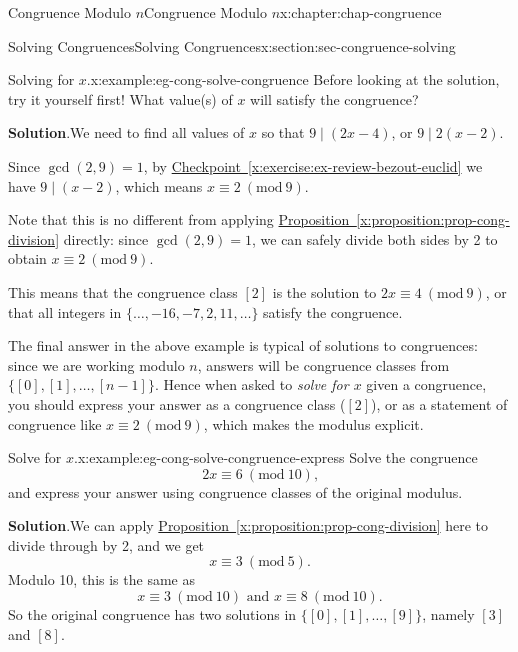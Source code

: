 \documentclass[oneside,10pt,]{book}
\newcommand{\blocktitlefont}{\relax}
\newcommand{\xreffont}{\relax}
\numberwithin{equation}{section}
\newcommand{\Mod}[1]{\ \left(\mathrm{mod}\ #1\right)}
\begin{document}
\begin{chapterptx}{Congruence Modulo \(n\)}{}{Congruence Modulo \(n\)}{}{}{x:chapter:chap-congruence}
\begin{sectionptx}{Solving Congruences}{}{Solving Congruences}{}{}{x:section:sec-congruence-solving}
\begin{example}{Solving for \(x\).}{x:example:eg-cong-solve-congruence}
Before looking at the solution, try it yourself first! What value(s) of \(x\) will satisfy the congruence?%
\par\smallskip%
\noindent\textbf{\blocktitlefont Solution}.\hypertarget{g:solution:id468645}{}\quad{}We need to find all values of \(x\) so that \(9 \mid (2x - 4)\), or \(9 \mid 2(x-2)\).%
\par
Since \(\gcd(2,9) = 1\), by \hyperref[x:exercise:ex-review-bezout-euclid]{Checkpoint~{\xreffont\ref{x:exercise:ex-review-bezout-euclid}}} we have \(9 \mid (x-2)\), which means \(x \equiv 2 \Mod{9}\).%
\par
Note that this is no different from applying \hyperref[x:proposition:prop-cong-division]{Proposition~{\xreffont\ref{x:proposition:prop-cong-division}}} directly: since \(\gcd(2,9) = 1\), we can safely divide both sides by 2 to obtain \(x \equiv 2 \Mod{9}\).%
\par
This means that the congruence class \([2]\) is the solution to \(2x \equiv 4 \Mod{9}\), or that all integers in \(\{\ldots,-16,-7,2,11,\ldots\}\) satisfy the congruence.%
\end{example}
The final answer in the above example is typical of solutions to congruences: since we are working modulo \(n\), answers will be congruence classes from \(\{[0],[1],\ldots,[n-1]\}\). Hence when asked to \emph{solve for \(x\)} given a congruence, you should express your answer as a congruence class (\([2]\)), or as a statement of congruence like \(x \equiv 2 \Mod{9}\), which makes the modulus explicit.%
\begin{example}{Solve for \(x\).}{x:example:eg-cong-solve-congruence-express}%
Solve the congruence%
\begin{equation*}
2x \equiv 6 \Mod{10}\text{,}
\end{equation*}
and express your answer using congruence classes of the original modulus.%
\par\smallskip%
\noindent\textbf{\blocktitlefont Solution}.\hypertarget{g:solution:id469026}{}\quad{}We can apply \hyperref[x:proposition:prop-cong-division]{Proposition~{\xreffont\ref{x:proposition:prop-cong-division}}} here to divide through by 2, and we get%
\begin{equation*}
x \equiv 3 \Mod{5}\text{.}
\end{equation*}
Modulo 10, this is the same as%
\begin{equation*}
x \equiv 3 \Mod{10} \text{ and } x \equiv 8 \Mod{10}\text{.}
\end{equation*}
So the original congruence has two solutions in \(\{[0],[1],\ldots,[9]\}\), namely \([3]\) and \([8]\).%

\end{example}
\end{sectionptx}
\end{chapterptx}
\end{document}
